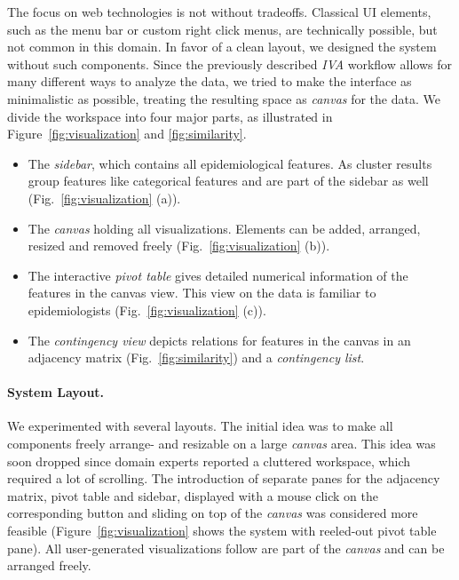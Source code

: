\documentclass[journal]{style/vgtc} 			          %
\begin{document}
The focus on web technologies is not without tradeoffs.
%
Classical UI elements, such as the menu bar or custom right click menus, are technically possible, but not common in this domain.
%
In favor of a clean layout, we designed the system without such components.
%
Since the previously described \emph{IVA} workflow allows for many different ways to analyze the data, we tried to make the interface as minimalistic as possible, treating the resulting space as \emph{canvas} for the data.
%
We divide the workspace into four major parts, as illustrated in Figure~\ref{fig:visualization} and \ref{fig:similarity}.
\begin{itemize} \itemsep0.2em
		\item The \emph{sidebar}, which contains all epidemiological features. As cluster results group features like categorical features and are part of the sidebar as well (Fig.~\ref{fig:visualization} (a)).
	\item The \emph{canvas} holding all visualizations. Elements can be added, arranged, resized and removed freely (Fig.~\ref{fig:visualization} (b)).
	\item The interactive \emph{pivot table} gives detailed numerical information of the features in the canvas view. This view on the data is familiar to epidemiologists (Fig.~\ref{fig:visualization} (c)).
	\item The \emph{contingency view} depicts relations for features in the canvas in an adjacency matrix (Fig.~\ref{fig:similarity}) and a \emph{contingency list}.
\end{itemize}

\paragraph{System Layout.}
We experimented with several layouts.
%
The initial idea was to make all components freely arrange- and resizable on a large \emph{canvas} area.
%
This idea was soon dropped since domain experts reported a cluttered workspace, which required a lot of scrolling.
%
The introduction of separate panes for the adjacency matrix, pivot table and sidebar, displayed with a mouse click on the corresponding button and sliding on top of the \emph{canvas} was considered more feasible (Figure~\ref{fig:visualization} shows the system with reeled-out pivot table pane).
%
All user-generated visualizations follow are part of the \emph{canvas} and can be arranged freely.
\end{document}
